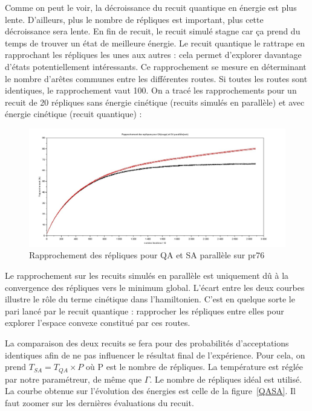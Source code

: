 \documentclass{article}%
\begin{document}
		Comme on peut le voir, la décroissance du recuit quantique en énergie est plus lente. D'ailleurs, plus le nombre de répliques est important, plus cette décroissance sera lente. En fin de recuit, le recuit simulé stagne car ça prend du temps de trouver un état de meilleure énergie. Le recuit quantique le rattrape en rapprochant les répliques les unes aux autres : cela permet d'explorer davantage d'états potentiellement intéressants. 
		Ce rapprochement se mesure en déterminant le nombre d'arêtes communes entre les différentes routes. Si toutes les routes sont identiques, le rapprochement vaut 100. On a tracé les rapprochements pour un recuit de 20 répliques sans énergie cinétique (recuits simulés en parallèle) et avec énergie cinétique (recuit quantique) : 
		
	\begin{figure}[!h]
	\begin{center}
	\includegraphics[scale=0.3]{rapprochement.jpg}
	\caption{Rapprochement des répliques pour QA et SA parallèle sur pr76}
	\end{center}
	\end{figure}

		Le rapprochement sur les recuits simulés en parallèle est uniquement dû à la convergence des répliques vers le minimum global. L'écart entre les deux courbes illustre le rôle du terme cinétique dans l'hamiltonien. C'est en quelque sorte le pari lancé par le recuit quantique : rapprocher les répliques entre elles pour explorer l'espace convexe constitué par ces routes.
		
		\vspace{1cm}
		La comparaison des deux recuits se fera pour des probabilités d'acceptations identiques afin de ne pas influencer le résultat final de l'expérience. Pour cela, on prend $T_{SA} = T_{QA} \times P $ où P est le nombre de répliques. La température est réglée par notre paramétreur, de même que $\Gamma$. Le nombre de répliques idéal est utilisé. La courbe obtenue sur l'évolution des énergies est celle de la figure~\ref{QASA}. Il faut zoomer sur les dernières évaluations du recuit.
		
\end{document}
